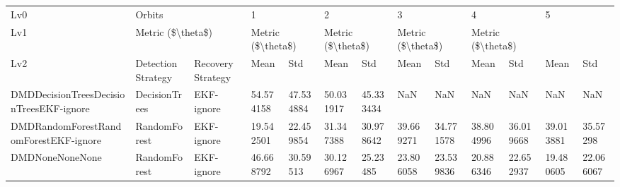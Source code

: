 \begin{tabular}{lllllllllllll}
\toprule
Lv0 & \multicolumn{2}{l}{Orbits} & \multicolumn{2}{l}{1} & \multicolumn{2}{l}{2} & \multicolumn{2}{l}{3} & \multicolumn{2}{l}{4} & \multicolumn{2}{l}{5} \\
Lv1 & \multicolumn{2}{l}{Metric (\$\textbackslash theta\$)} & \multicolumn{2}{l}{Metric (\$\textbackslash theta\$)} & \multicolumn{2}{l}{Metric (\$\textbackslash theta\$)} & \multicolumn{2}{l}{Metric (\$\textbackslash theta\$)} & \multicolumn{2}{l}{Metric (\$\textbackslash theta\$)} \\
Lv2 & Detection Strategy & Recovery Strategy &              Mean &        Std &              Mean &        Std &              Mean &        Std &              Mean &        Std &              Mean &        Std \\
\midrule
DMDDecisionTreesDecisionTreesEKF-ignore &      DecisionTrees &        EKF-ignore &         54.574158 &  47.534884 &         50.031917 &  45.333434 &               NaN &        NaN &               NaN &        NaN &               NaN &        NaN \\
DMDRandomForestRandomForestEKF-ignore   &       RandomForest &        EKF-ignore &         19.542501 &  22.459854 &         31.347388 &  30.978642 &         39.669271 &  34.771578 &         38.804996 &  36.019668 &         39.013881 &   35.57298 \\
DMDNoneNoneNone                         &       RandomForest &        EKF-ignore &         46.668792 &   30.59513 &         30.126967 &   25.23485 &         23.806058 &  23.539836 &         20.886346 &  22.652937 &         19.480605 &  22.066067 \\
\bottomrule
\end{tabular}
